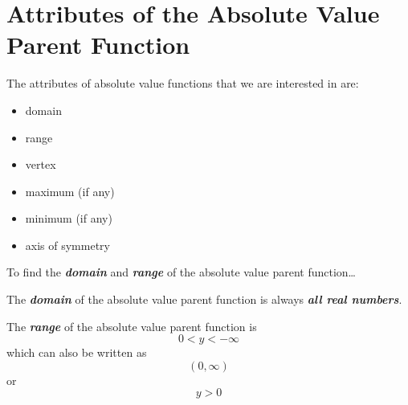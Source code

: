 
\section*{Attributes of the Absolute Value Parent Function}

The attributes of absolute value functions that we are interested in are:
\begin{itemize}[itemsep=0.1\baselineskip]
    \item domain
    \item range
    \item vertex
    \item maximum (if any)
    \item minimum (if any)
    \item axis of symmetry
\end{itemize}




\begin{myConceptSteps}{
        To find the 
        {\bfseries\itshape domain} and {\bfseries\itshape range} 
        of the absolute value parent function\dots
    }
\end{myConceptSteps}



\begin{center}
    \begin{tcolorbox}[width=4in]
        The {\bfseries\itshape domain} of the absolute value parent function 
        is always {\bfseries\itshape all real numbers}.
    \end{tcolorbox}
\end{center}



\begin{center}
    \begin{tcolorbox}[width=4in]
        The {\bfseries\itshape range} of the absolute value parent function 
        is 
        \[0 < y < -\infty \]
        which can also be written as
        \[(0,\infty)\]
        or
        \[y>0\]
    \end{tcolorbox}
\end{center}



